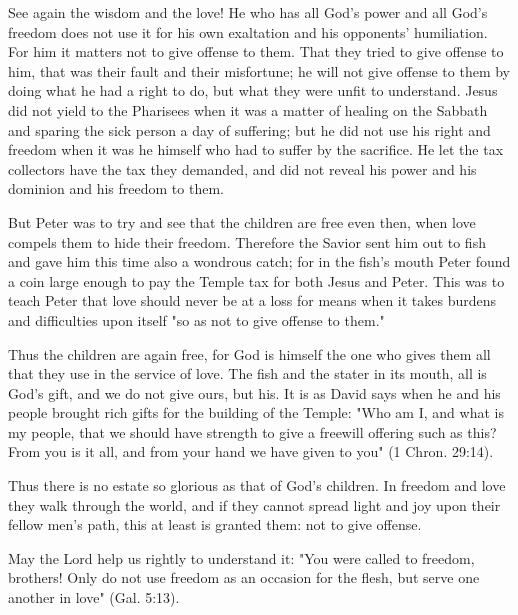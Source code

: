 See again the wisdom and the love! He who has all God’s power and all God’s freedom does not use it for his own exaltation and his opponents’ humiliation. For him it matters not to give offense to them. That they tried to give offense to him, that was their fault and their misfortune; he will not give offense to them by doing what he had a right to do, but what they were unfit to understand. Jesus did not yield to the Pharisees when it was a matter of healing on the Sabbath and sparing the sick person a day of suffering; but he did not use his right and freedom when it was he himself who had to suffer by the sacrifice. He let the tax collectors have the tax they demanded, and did not reveal his power and his dominion and his freedom to them.

But Peter was to try and see that the children are free even then, when love compels them to hide their freedom. Therefore the Savior sent him out to fish and gave him this time also a wondrous catch; for in the fish’s mouth Peter found a coin large enough to pay the Temple tax for both Jesus and Peter. This was to teach Peter that love should never be at a loss for means when it takes burdens and difficulties upon itself "so as not to give offense to them."

Thus the children are again free, for God is himself the one who gives them all that they use in the service of love. The fish and the stater in its mouth, all is God’s gift, and we do not give ours, but his. It is as David says when he and his people brought rich gifts for the building of the Temple: "Who am I, and what is my people, that we should have strength to give a freewill offering such as this? From you is it all, and from your hand we have given to you" (1 Chron. 29:14).

Thus there is no estate so glorious as that of God’s children. In freedom and love they walk through the world, and if they cannot spread light and joy upon their fellow men’s path, this at least is granted them: not to give offense.

May the Lord help us rightly to understand it: "You were called to freedom, brothers! Only do not use freedom as an occasion for the flesh, but serve one another in love" (Gal. 5:13).
